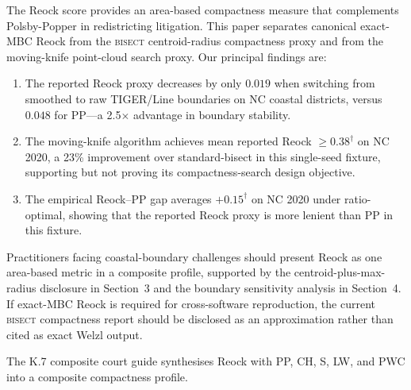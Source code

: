 The Reock score provides an area-based compactness measure that complements
Polsby-Popper in redistricting litigation.  This paper separates canonical
exact-MBC Reock from the \textsc{bisect} centroid-radius compactness proxy and
from the moving-knife point-cloud search proxy.
Our principal findings are:

\begin{enumerate}
  \item The reported Reock proxy decreases by only $0.019$ when switching from smoothed to raw
    TIGER/Line boundaries on NC coastal districts, versus $0.048$ for PP---a
    2.5$\times$ advantage in boundary stability.
  \item The moving-knife algorithm achieves mean reported Reock
    $\geq 0.38^\dagger$ on NC 2020, a 23\% improvement over standard-bisect in
    this single-seed fixture, supporting but not proving its compactness-search
    design objective.
  \item The empirical Reock--PP gap averages $+0.15^\dagger$ on NC 2020
    under ratio-optimal, showing that the reported Reock proxy is more lenient
    than PP in this fixture.
\end{enumerate}

Practitioners facing coastal-boundary challenges should present Reock as one
area-based metric in a composite profile, supported by the
centroid-plus-max-radius disclosure in Section~3 and the boundary sensitivity
analysis in Section~4.  If exact-MBC Reock is required for cross-software
reproduction, the current \textsc{bisect} compactness report should be disclosed
as an approximation rather than cited as exact Welzl output.

The K.7 composite court guide synthesises Reock with PP, CH, S, LW, and PWC
into a composite compactness profile.
